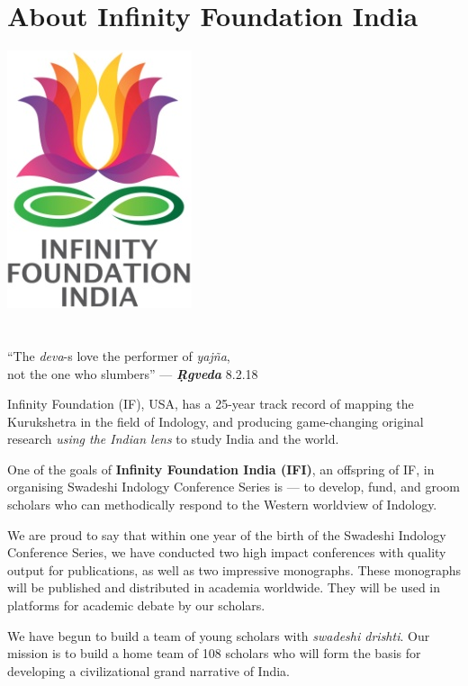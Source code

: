 
\chapter*{About Infinity Foundation India}\label{about}

\begin{center}
 \includegraphics[scale=0.23]{images/logo.png}\\\\\\
 “The \textit{deva}-s love the performer of \textit{yajña},\\ 
 not the one who slumbers” — \textbf{\textit{Ṛgveda}} 8.2.18
\end{center}

\vskip -10pt

Infinity Foundation (IF), USA, has a 25-year track record of mapping the Kurukshetra in the field of Indology, and producing game-changing original research \textit{using the Indian lens} to study India and the world.

One of the goals of \textbf{Infinity Foundation India (IFI)}, an offspring of IF, in organising Swadeshi Indology Conference Series is — to develop, fund, and groom scholars who can methodically respond to the Western worldview of Indology.

We are proud to say that within one year of the birth of the Swadeshi Indology Conference Series, we have conducted two high impact conferences with quality output for publications, as well as two impressive monographs. These monographs will be published and distributed in academia worldwide. They will be used in platforms for academic debate by our scholars.

We have begun to build a team of young scholars with \textit{swadeshi drishti}. Our mission is to build a home team of 108 scholars who will form the basis for developing a civilizational grand narrative of India.
